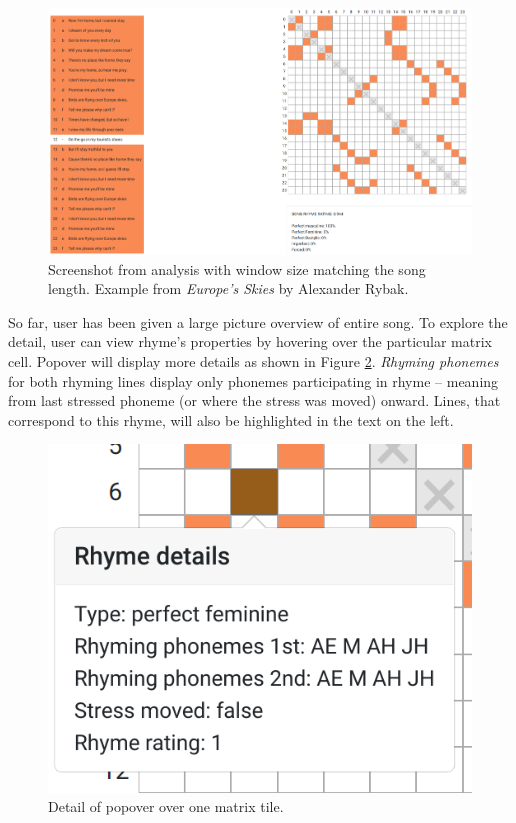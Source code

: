 \begin{figure}[!h]\centering
		\includegraphics[scale=0.24]{../img/europes-skies.png}
	\caption[Screenshot from analysis with window size matching the song length.]{Screenshot from analysis with window size matching the song length. Example from \textit{Europe's Skies} by Alexander Rybak.}
	\label{web-analysis_window_all}
\end{figure}

So far, user has been given a large picture overview of entire song. To explore the detail, user can view rhyme's properties by hovering over the particular matrix cell. Popover will display more details as shown in Figure \ref{web-popover}. \textit{Rhyming phonemes} for both rhyming lines display only phonemes participating in rhyme -- meaning from last stressed phoneme (or where the stress was moved) onward. Lines, that correspond to this rhyme, will also be highlighted in the text on the left. 

\begin{figure}[h]\centering
		\includegraphics[scale=0.45]{../img/popover-detail.png}
	\caption{Detail of popover over one matrix tile.}
	\label{web-popover}
\end{figure}



